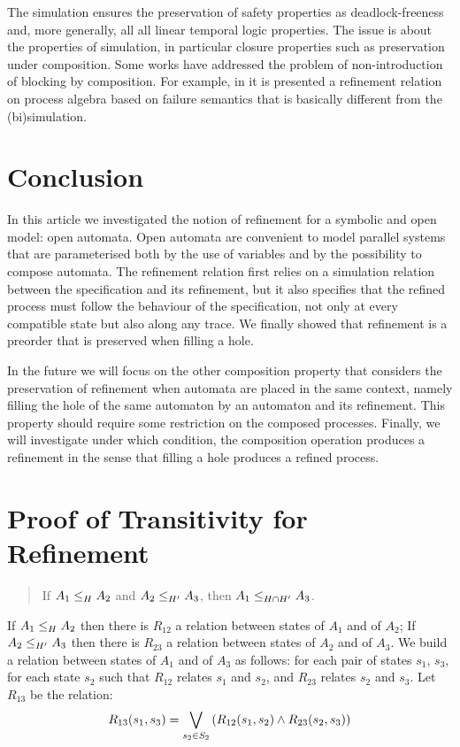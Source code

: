 \documentclass[runningheads]{llncs}
\begin{document}
The simulation  ensures the preservation of   
safety properties as deadlock-freeness  and, more generally, all 
all linear temporal logic properties.  The issue is about the properties of simulation, in particular closure properties such as preservation under composition. Some works   have addressed the problem of non-introduction of blocking by composition. For example, in \cite{DIHEGO2020110598} it is presented a refinement relation on process algebra based on failure semantics that is basically different from the (bi)simulation\cite{10.5555/640428.640430}.   
  
 





\section{Conclusion}\label{sec:ccl}
In this article we investigated the notion of refinement for a symbolic and open model: open automata. 
Open automata are convenient to model parallel systems that are parameterised both by the use of variables and by the possibility to compose automata.
The refinement relation first relies on a simulation relation between the specification and its refinement, but it also specifies that the refined process must follow the behaviour of the specification, not only at every compatible state but also along any trace.
We finally showed that refinement is a preorder that is preserved when filling a hole.

In the future we will focus on the other composition property that considers the preservation of refinement when automata are placed in the same context, namely filling the hole of the same automaton by an automaton and its refinement. This property should require some restriction on the composed processes.
 Finally, we will investigate under which condition, the composition operation produces a refinement in the sense that filling a hole produces a refined process.




 
 

\newpage

\appendix


\section{Proof of Transitivity for Refinement}\label{sec:proof-transitivity}
\begin{quote}
If $\wrel{A_1}{A_2}{H}$ and $\wrel{A_2}{A_3}{H'}$, then $\wrel{A_1}{A_3}{H\cap H'}$.
\end{quote}
\proof 
If $\wrel{A_1}{A_2}{H}$ then there is $R_{12}$ a relation between states
of $A_1$ and of $A_2$;  If $\wrel{A_2}{A_3}{H'}$ then there is $R_{23}$ a relation between states of $A_2$ and of $A_3$. We build a relation between
 states of $A_1$ and of $A_3$ as follows:  for each pair of states $s_1$, $s_3$, for each state $s_2$ such that $R_{12}$ relates $s_1$ and $s_2$, and $R_{23}$ relates $s_2$ and $s_3$.
Let $R_{13}$ be the relation:\\
  \[R_{13}(s_1,s_3)=\bigvee_{s_2\in S_2}\mpar{R_{12}(s_1,s_2) \land R_{23}(s_2,s_3) } \]
\end{document}
